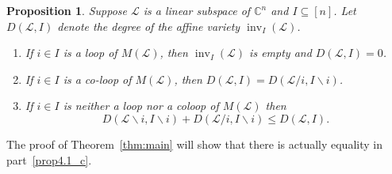 \documentclass[10pt]{amsart}
\newtheorem{prop}[theo]{Proposition}
\theoremstyle{definition}
\newcommand{\Cbb}{\mathbb{C}}
\newcommand{\cL}{\mathcal{L}}
\DeclareMathOperator{\inv}{inv}
\begin{document}
\begin{prop}\label{prop:DegreeRecurrence}
Suppose $\cL$ is a linear subspace of $\Cbb^n$ and $I\subseteq [n]$. 
Let $D(\cL,I)$ denote the degree of the affine variety $\inv_I(\cL)$. 
\begin{enumerate}[(\alph*)] 
\item\label{prop4.1_a} %
If $i \in I$ is a loop of $M(\cL)$, then $\inv_I(\cL)$ is empty and $D(\cL,I) = 0$. 
\item\label{prop4.1_b} %
If $i\in I$ is a co-loop of $M(\cL)$, then $D(\cL,I) = D(\cL/i, I\backslash i)$. 
\item\label{prop4.1_c} %
If $i\in I$ is neither a loop nor a coloop of $M(\cL)$ then
\[
D(\cL\backslash i,I\backslash i)  +  D(\cL/i, I\backslash i) \leq D(\cL,I).
\]
\end{enumerate}
\end{prop}
The proof of Theorem~\ref{thm:main} will show that there is actually equality in part~\ref{prop4.1_c}. 
\end{document}
